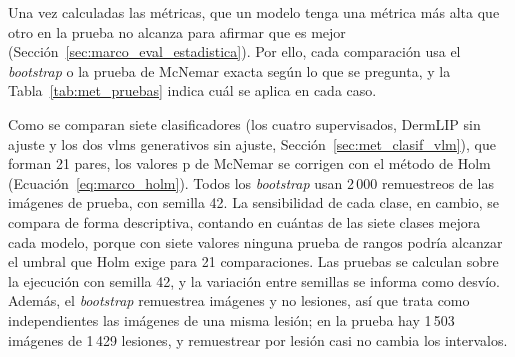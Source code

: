 Una vez calculadas las métricas, que un modelo tenga una métrica más alta que otro en la prueba no alcanza para afirmar
que es mejor (Sección~\ref{sec:marco_eval_estadistica}). Por ello, cada comparación usa el \emph{bootstrap} o la
prueba de McNemar exacta según lo que se pregunta, y la Tabla~\ref{tab:met_pruebas} indica cuál se aplica en cada caso.

Como se comparan siete clasificadores (los cuatro supervisados, DermLIP sin ajuste y los dos \glspl{vlm}
generativos sin ajuste, Sección~\ref{sec:met_clasif_vlm}), que forman 21 pares, los valores p de McNemar se corrigen
con el método de Holm (Ecuación~\ref{eq:marco_holm}). Todos los \emph{bootstrap} usan 2\,000 remuestreos de las
imágenes de prueba, con semilla 42. La sensibilidad de cada clase, en cambio, se compara de forma descriptiva, contando en cuántas de las siete
clases mejora cada modelo, porque con siete valores ninguna prueba de rangos podría alcanzar el umbral que Holm exige
para 21 comparaciones. Las pruebas se calculan sobre la ejecución con semilla 42, y la variación entre semillas se
informa como desvío. Además, el \emph{bootstrap} remuestrea imágenes y no lesiones, así que trata como independientes las imágenes de una misma
lesión; en la prueba hay 1\,503 imágenes de 1\,429 lesiones, y remuestrear por lesión casi no cambia los intervalos.

